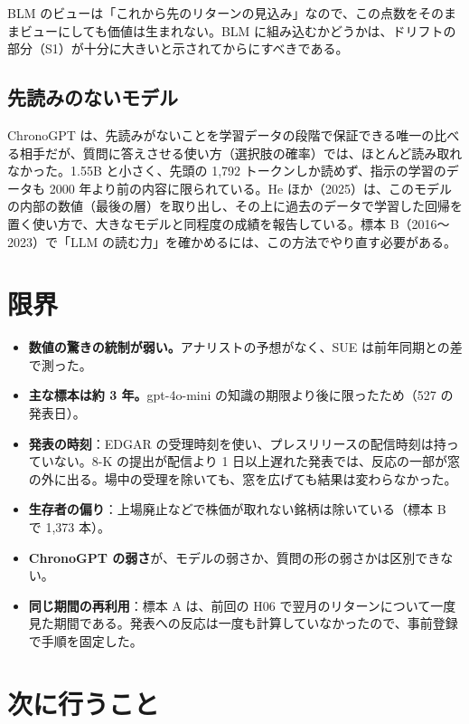 \documentclass[xelatex,ja=standard,jafont=haranoaji,a4paper,10pt,openany]{bxjsreport}
\begin{document}
BLM のビューは「これから先のリターンの見込み」なので、この点数をそのままビューにしても価値は生まれない。BLM に組み込むかどうかは、ドリフトの部分（S1）が十分に大きいと示されてからにすべきである。

\section{先読みのないモデル}

ChronoGPT は、先読みがないことを学習データの段階で保証できる唯一の比べる相手だが、質問に答えさせる使い方（選択肢の確率）では、ほとんど読み取れなかった。1.55B と小さく、先頭の 1,792 トークンしか読めず、指示の学習のデータも 2000 年より前の内容に限られている。He ほか（2025）は、このモデルの内部の数値（最後の層）を取り出し、その上に過去のデータで学習した回帰を置く使い方で、大きなモデルと同程度の成績を報告している。標本 B（2016〜2023）で「LLM の読む力」を確かめるには、この方法でやり直す必要がある。

\chapter{限界}\label{ch:limits}

\begin{itemize}
\item \textbf{数値の驚きの統制が弱い。}アナリストの予想がなく、SUE は前年同期との差で測った。
\item \textbf{主な標本は約 3 年。}gpt-4o-mini の知識の期限より後に限ったため（527 の発表日）。
\item \textbf{発表の時刻}：EDGAR の受理時刻を使い、プレスリリースの配信時刻は持っていない。8-K の提出が配信より 1 日以上遅れた発表では、反応の一部が窓の外に出る。場中の受理を除いても、窓を広げても結果は変わらなかった。
\item \textbf{生存者の偏り}：上場廃止などで株価が取れない銘柄は除いている（標本 B で 1,373 本）。
\item \textbf{ChronoGPT の弱さ}が、モデルの弱さか、質問の形の弱さかは区別できない。
\item \textbf{同じ期間の再利用}：標本 A は、前回の H06 で翌月のリターンについて一度見た期間である。発表への反応は一度も計算していなかったので、事前登録で手順を固定した。
\end{itemize}

\chapter{次に行うこと}\label{ch:next}
\end{document}
